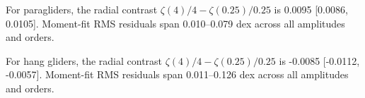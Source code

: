 For paragliders, the radial contrast $\zeta(4)/4-\zeta(0.25)/0.25$ is 0.0095 [0.0086, 0.0105]. Moment-fit RMS residuals span 0.010--0.079 dex across all amplitudes and orders.

For hang gliders, the radial contrast $\zeta(4)/4-\zeta(0.25)/0.25$ is -0.0085 [-0.0112, -0.0057]. Moment-fit RMS residuals span 0.011--0.126 dex across all amplitudes and orders.
